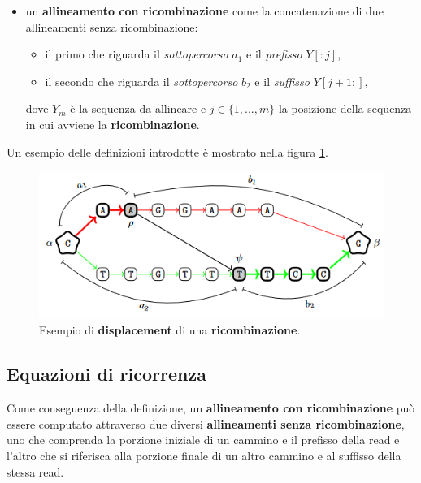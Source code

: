 \begin{itemize}
        \item un \textbf{allineamento con ricombinazione} come la concatenazione di due allineamenti senza ricombinazione:
        \begin{itemize}
            \item il primo che riguarda il \emph{sottopercorso} $a_1$ e il \emph{prefisso} $Y[:j]$,
            \item il secondo che riguarda il \emph{sottopercorso} $b_2$ e il \emph{suffisso} $Y[j+1:]$,
        \end{itemize}
        dove $Y_m$ è la sequenza da allineare e $j \in \{1, ..., m\}$ la posizione della sequenza in cui avviene la \textbf{ricombinazione}. 
    \end{itemize}

    Un esempio delle definizioni introdotte è mostrato nella figura \ref{fig:recombination_definitions_example}.

    \vspace{20pt}
    \begin{figure}[H]
        \centering
        \includegraphics[width=1.0\linewidth]{images/recombination_definitions_example.png}
        \caption{Esempio di \textbf{displacement} di una \textbf{ricombinazione}. \cite{Recgraph}}
        \label{fig:recombination_definitions_example}
    \end{figure}

\subsection{Equazioni di ricorrenza}
    Come conseguenza della definizione, un \textbf{allineamento con ricombinazione} può essere computato attraverso due diversi \textbf{allineamenti senza ricombinazione}, uno che comprenda la porzione iniziale di un cammino e il prefisso della read e l'altro che si riferisca alla porzione finale di un altro cammino e al suffisso della stessa read.

